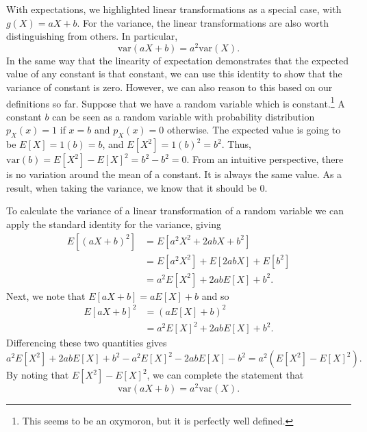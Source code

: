 \documentclass[
  letterpaper,
  DIV=11,
  numbers=noendperiod]{scrreprt}
\theoremstyle{definition}
\theoremstyle{definition}
\theoremstyle{definition}
\theoremstyle{remark}
\begin{document}
With expectations, we highlighted linear transformations as a special
case, with \(g(X) = aX + b\). For the variance, the linear
transformations are also worth distinguishing from others. In
particular, \[\text{var}(aX + b) = a^2\text{var}(X).\] In the same way
that the linearity of expectation demonstrates that the expected value
of any constant is that constant, we can use this identity to show that
the variance of constant is zero. However, we can also reason to this
based on our definitions so far. Suppose that we have a random variable
which is constant.\footnote{This seems to be an oxymoron, but it is
  perfectly well defined.} A constant \(b\) can be seen as a random
variable with probability distribution \(p_X(x) = 1\) if \(x=b\) and
\(p_X(x) = 0\) otherwise. The expected value is going to be
\(E[X] = 1(b) = b\), and \(E[X^2] = 1(b)^2 = b^2\). Thus,
\(\text{var}(b) = E[X^2] - E[X]^2 = b^2 - b^2 = 0\). From an intuitive
perspective, there is no variation around the mean of a constant. It is
always the same value. As a result, when taking the variance, we know
that it should be \(0\).

\begin{tcolorbox}[enhanced jigsaw, coltitle=black, colframe=quarto-callout-warning-color-frame, colbacktitle=quarto-callout-warning-color!10!white, bottomrule=.15mm, opacitybacktitle=0.6, colback=white, toptitle=1mm, arc=.35mm, leftrule=.75mm, bottomtitle=1mm, opacityback=0, breakable, rightrule=.15mm, title={Proof of the Variance of Linear Transformations}, left=2mm, titlerule=0mm, toprule=.15mm]

To calculate the variance of a linear transformation of a random
variable we can apply the standard identity for the variance, giving
\begin{align*}
E[(aX+b)^2] &= E[a^2X^2 + 2abX + b^2] \\
&= E[a^2X^2] + E[2abX] + E[b^2]\\
&= a^2E[X^2] + 2abE[X] + b^2.
\end{align*} Next, we note that \(E[aX + b] = aE[X] + b\) and so
\begin{align*}
E[aX + b]^2 &= (aE[X] + b)^2 \\
&= a^2E[X]^2 + 2abE[X] + b^2.\end{align*} Differencing these two
quantities gives
\[a^2E[X^2] + 2abE[X] + b^2 - a^2E[X]^2 - 2abE[X] - b^2 = a^2(E[X^2] - E[X]^2).\]
By noting that \(E[X^2] - E[X]^2\), we can complete the statement that
\[\text{var}(aX + b) = a^2\text{var}(X).\]

\end{tcolorbox}
\end{document}
